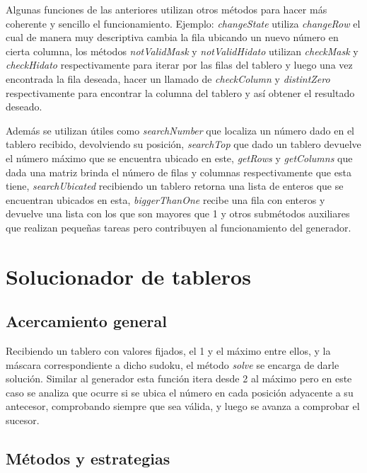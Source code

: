 \documentclass[10pt]{amsart}
\begin{document}
    Algunas funciones de las anteriores utilizan otros m\'etodos para hacer m\'as coherente y sencillo el funcionamiento. Ejemplo: \textit{changeState} utiliza \textit{changeRow} el cual de manera muy descriptiva cambia la fila ubicando un nuevo n\'umero en cierta columna, los m\'etodos \textit{notValidMask} y \textit{notValidHidato} utilizan \textit{checkMask} y \textit{checkHidato} respectivamente para iterar por las filas del tablero y luego una vez encontrada la fila deseada, hacer un llamado de \textit{checkColumn} y \textit{distintZero} respectivamente para encontrar la columna del tablero y as\'i obtener el resultado deseado.
	 
    Adem\'as se utilizan \'utiles como \textit{searchNumber} que localiza un n\'umero dado en el tablero recibido, devolviendo su posici\'on, \textit{searchTop} que dado un tablero devuelve el número m\'aximo que se encuentra ubicado en este, \textit{getRows} y \textit{getColumns} que dada una matriz brinda el n\'umero de filas y columnas respectivamente que esta tiene, \textit{searchUbicated} recibiendo un tablero retorna una lista de enteros que se encuentran ubicados en esta, \textit{biggerThanOne} recibe una fila con enteros y devuelve una lista con los que son mayores que 1 y otros subm\'etodos auxiliares que realizan pequeñas tareas pero contribuyen al funcionamiento del generador.

    \newpage
    
    \section*{Solucionador de tableros}
	 
    \subsection*{Acercamiento general}
	
    Recibiendo un tablero con valores fijados, el 1 y el m\'aximo entre ellos, y la m\'ascara correspondiente a dicho sudoku, el m\'etodo \textit{solve} se encarga de darle soluci\'on. Similar al generador esta funci\'on itera desde 2 al m\'aximo pero en este caso se analiza que ocurre si se ubica el n\'umero en cada posici\'on adyacente a su antecesor, comprobando siempre que sea v\'alida, y luego se avanza a comprobar el sucesor.
	 
    \subsection*{M\'etodos y estrategias}
	
\end{document}
